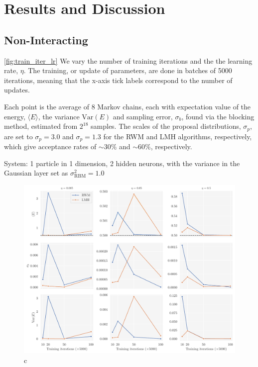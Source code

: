 \section{Results and Discussion}\label{sec:Results}

\subsection{Non-Interacting}\label{sec:project results}

\autoref{fig:train_iter_lr} We vary the number of training iterations and the the learning rate, $\eta$. The training, or update of parameters, are done in batches of 5000 iterations, meaning that the x-axis tick labels correspond to the number of updates. 

Each point is the average of 8 Markov chains, each with expectation value of the energy, $\langle E \rangle$, the variance $\mathrm{Var}(E)$ and sampling error, $\sigma_b$, found via the blocking method, estimated from $2^{18}$ samples. The scales of the proposal distributions, $\sigma_p$, are set to $\sigma_p=3.0$ and $\sigma_p=1.3$ for the RWM and LMH algorithms, respectively, which give acceptance rates of $\sim 30\%$ and $\sim60\%$, respectively. 

System: 1 particle in 1 dimension, 2 hidden neurons, with the variance in the Gaussian layer set as $\sigma_\mathrm{RBM}^2=1.0$

\begin{figure}[!htb]
\begin{center}\includegraphics[width=\textwidth]{latex/figures/training_cycles_lr.pdf}
\end{center}
\caption{c}
\label{fig:train_iter_lr}
\end{figure}

